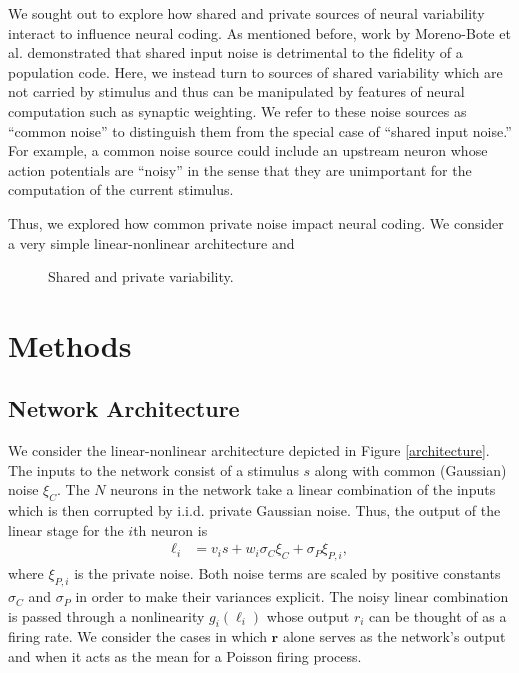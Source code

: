 \documentclass[11pt]{article}
\begin{document}
We sought out to explore how shared and private sources of neural variability interact to influence neural coding. As mentioned before, work by Moreno-Bote et al. demonstrated that shared input noise is detrimental to the fidelity of a population code. Here, we instead turn to sources of shared variability which are not carried by stimulus and thus can be manipulated by features of neural computation such as synaptic weighting. We refer to these noise sources as ``common noise'' to distinguish them from the special case of ``shared input noise.'' For example, a common noise source could include an upstream neuron whose action potentials are ``noisy'' in the sense that they are unimportant for the computation of the current stimulus.

Thus, we explored how common private noise impact neural coding. We consider a very simple linear-nonlinear architecture and  
\begin{figure}[t]
	\centering
	\caption{Shared and private variability.}
	\label{fig:private-shared}
\end{figure}


\newpage 
\section{Methods}

\subsection{Network Architecture}
	We consider the linear-nonlinear architecture depicted in Figure \ref{architecture}. The inputs to the network consist of a stimulus $s$ along with common (Gaussian) noise $\xi_C$. The $N$ neurons in the network take a linear combination of the inputs which is then corrupted by i.i.d. private Gaussian noise. Thus, the output of the linear stage for the $i$th neuron is 
	\begin{align}
		\ell_i &= v_i s + w_i \sigma_C \xi_C + \sigma_P\xi_{P,i},
	\end{align}
	where $\xi_{P,i}$ is the private noise. Both noise terms are scaled by positive constants $\sigma_C$ and $\sigma_P$ in order to make their variances explicit. The noisy linear combination is passed through a nonlinearity $g_i(\ell_i)$ whose output $r_i$ can be thought of as a firing rate. We consider the cases in which $\mathbf{r}$ alone serves as the network's output and when it acts as the mean for a Poisson firing process.
	
\end{document}
